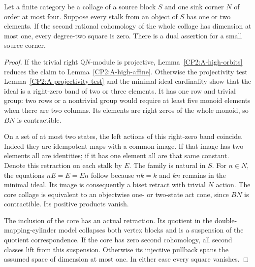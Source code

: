 \begin{lemma}
\label{CP2:A-high-small-binary}
Let a finite category be a collage of a source block $S$ and
one sink corner $N$ of order at most four.  Suppose every
stalk from an object of $S$ has one or two elements.  If the
second rational cohomology of the whole collage has dimension
at most one, every degree-two square is zero.  There is a
dual assertion for a small source corner.
\end{lemma}
\begin{proof}
If the trivial right $\mathbb QN$-module is projective,
Lemma~\ref{CP2:A-high-orbits} reduces the claim to
Lemma~\ref{CP2:A-high-affine}.
Otherwise the projectivity test
Lemma~\ref{CP2:A-projectivity-test} and the minimal-ideal
cardinality show that the ideal is a right-zero band of two
or three elements.  It has one row and trivial group: two
rows or a nontrivial group would require at least five
monoid elements when there are two columns.  Its elements
are right zeros of the whole monoid, so $BN$ is contractible.

On a set of at most two states, the left actions of this
right-zero band coincide.  Indeed they are idempotent maps
with a common image.  If that image has two elements all
are identities; if it has one element all are that same
constant.  Denote this retraction on each stalk by $E$.
The family is natural in $S$.  For $n\in N$, the equations
$nE=E=En$ follow because $nk=k$ and $kn$ remains in the
minimal ideal.  Its image is consequently a biset retract
with trivial $N$ action.  The core collage is equivalent
to an objectwise one- or two-state act cone, since $BN$
is contractible.  Its positive products vanish.

The inclusion of the core has an actual retraction.  Its
quotient in the double-mapping-cylinder model collapses
both vertex blocks and is a suspension of the quotient
correspondence.  If the core has zero second cohomology,
all second classes lift from this suspension.  Otherwise
its injective pullback spans the assumed space of dimension
at most one.  In either case every square vanishes.
\end{proof}

